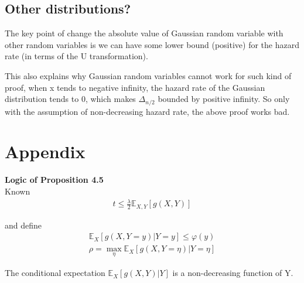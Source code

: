 \documentclass{article}
\theoremstyle{plain}
\begin{document}
\subsection{Other distributions?}
The key point of change the absolute value of Gaussian random variable with other random variables is we can have some lower bound (positive) for the hazard rate (in terms of the U transformation). 

This also explains why Gaussian random variables cannot work for such kind of proof, when x tends to negative infinity, the hazard rate of the Gaussian distribution tends to 0, which makes $\Delta_{n/2}$ bounded by positive infinity. So only with the assumption of non-decreasing hazard rate, the above proof works bad. 



\section*{Appendix}

\textbf{Logic of \cite{boucheron2012} Proposition 4.5}\\

Known
\begin{align}
    t \leq  \frac{\lambda}{2} \mathbb{E}_{X, Y}[g(X, Y)]
\end{align}

and define
\begin{align}
    \mathbb{E}_X[g(X, Y = y)| Y = y] \leq \varphi (y)\\
    \rho = \max_{\eta} \mathbb{E}_X[g(X, Y = \eta)|Y = \eta]
\end{align}

The conditional expectation $\mathbb{E}_X[g(X, Y)| Y]$ is a non-decreasing function of Y.\\
\end{document}
